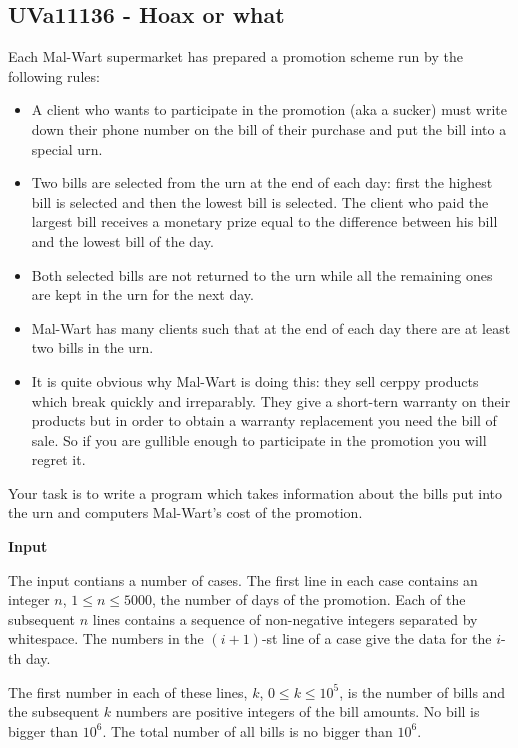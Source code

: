\subsection{UVa11136 - Hoax or what}
Each Mal-Wart supermarket has prepared a promotion scheme run by the following rules:

\begin{itemize}
\item A client who wants to participate in the promotion (aka a sucker) must write down their phone number on the bill of their purchase and put the bill into a special urn.
\item Two bills are selected from the urn at the end of each day: first the highest bill is selected and then the lowest bill is selected. The client who paid the largest bill receives a monetary prize equal to the difference between his bill and the lowest bill of the day.
\item Both selected bills are not returned to the urn while all the remaining ones are kept in the urn for the next day.
\item Mal-Wart has many clients such that at the end of each day there are at least two bills in the urn.
\item It is quite obvious why Mal-Wart is doing this: they sell cerppy products which break quickly and irreparably. They give a short-tern warranty on their products but in order to obtain a warranty replacement you need the bill of sale. So if you are gullible enough to participate in the promotion you will regret it.
\end{itemize}

Your task is to write a program which takes information about the bills put into the urn and computers Mal-Wart's cost of the promotion.

\begin{flushleft}
{\color{red} \textbf{Input}}
\end{flushleft}
The input contians a number of cases. The first line in each case contains an integer $n$, $1 \leq n \leq 5000$, the number of days of the promotion. Each of the subsequent $n$ lines contains a sequence of non-negative integers separated by whitespace. The numbers in the $(i+1)$-st line of a case give the data for the $i$-th day.

The first number in each of these lines, $k$, $0 \leq k \leq 10^5$, is the number of bills and the subsequent $k$ numbers are positive integers of the bill amounts. No bill is bigger than $10^6$. The total number of all bills is no bigger than $10^6$.

